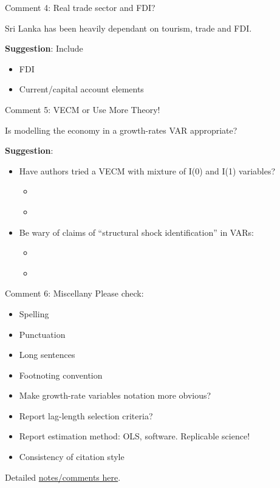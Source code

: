 \documentclass[10pt,english,slidetop,compress,
              blue,mathserif,color=option]{beamer}
\def\linkcomment{https://github.com/phantomachine/discussion_VAR-LKA}
\theoremstyle{plain}
\theoremstyle{definition}
\begin{document}
\begin{frame}{Comment 4: Real trade sector and FDI?}
  
  Sri Lanka has been heavily dependant on tourism, trade and FDI. 
  \bigskip

  \textbf{Suggestion}: Include
    \begin{itemize}
      \item FDI
      \item Current/capital account elements
    \end{itemize}

\end{frame}

\begin{frame}{Comment 5: VECM or Use More Theory!}

  Is modelling the economy in a growth-rates VAR appropriate? 

  \bigskip

  \textbf{Suggestion}: 
    \begin{itemize}
      \item Have authors tried a VECM with mixture of I(0) and I(1) variables? 
      \begin{itemize}
        \item \citet{phillips1995}
        \item \citet{chang-phillips1995}
      \end{itemize}
      
      \item Be wary of claims of ``structural shock identification'' in VARs:
        \begin{itemize}
          \item \citet{uhlig2017}
          \item \citet{yao-kam-vahid2017}
        \end{itemize}
    \end{itemize}
\end{frame}

\begin{frame}{Comment 6: Miscellany}
  Please check:
  \begin{itemize}
    \item Spelling
    \item Punctuation
    \item Long sentences
    \item Footnoting convention
    \item Make growth-rate variables notation more obvious?
    \item Report lag-length selection criteria?
    \item Report estimation method: OLS, software. Replicable science!
    \item Consistency of citation style
  \end{itemize}

  Detailed \href{\linkcomment}{notes/comments here}.
\end{frame}
\end{document}

